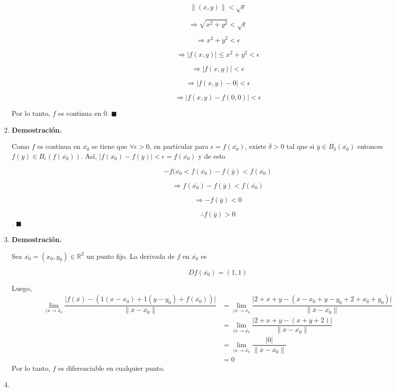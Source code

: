 \documentclass[fleqn]{article}
\begin{document}
\begin{enumerate}
        $$ \lVert (x,y) \rVert < \sqrt{\epsilon} $$

        $$ \Longrightarrow \sqrt{x^2 + y^2} < \sqrt{\epsilon} $$

        $$ \Longrightarrow x^2 + y^2 < \epsilon $$

        $$ \Longrightarrow \lvert f(x,y) \rvert \leq x^2 + y^2 < \epsilon $$

        $$ \Longrightarrow \lvert f(x,y) \rvert < \epsilon $$

        $$ \Longrightarrow \lvert f(x,y) - 0 \rvert < \epsilon $$

        $$ \Longrightarrow \lvert f(x,y) - f(0,0) \rvert < \epsilon $$

        Por lo tanto, $ f $ es continua en $ \overline{0} $. $ \blacksquare $

        \item \textbf{Demostración.}

        Como $ f $ es continua en $ \overline{x_0} $ se tiene que $ \forall \epsilon > 0 $, en particular para $ \epsilon = f(\overline{x_0}) $, existe $ \delta > 0 $ tal que si $ \overline{y} \in B_\delta (\overline{x_0}) $ entonces $ f(\overline{y}) \in B_\epsilon (f(\overline{x_0})) $. Así, $ \lvert f(\overline{x_0}) - f(\overline{y}) \rvert < \epsilon = f(\overline{x_0}) $ y de esto

        $$ -f(\overline{x_0} < f(\overline{x_0}) - f(\overline{y}) < f(\overline{x_0}) $$

        $$ \Longrightarrow f(\overline{x_0}) - f(\overline{y}) < f(\overline{x_0}) $$

        $$ \Longrightarrow - f(\overline{y}) < 0 $$

        $$ \therefore f(\overline{y}) > 0 $$. $ \blacksquare $

        \item \textbf{Demostración.}

        Sea $ \overline{x_0} = (x_0,y_0) \in \mathbb{R}^2 $ un punto fijo. La derivada de $ f $ en $ \overline{x_0} $ es

        $$ D f(\overline{x_0}) = (1,1) $$ 
        
        Luego,
        \begin{align*}
            \lim_{(\overline{x} \to \overline{x_0}} \dfrac{\lvert f(\overline{x}) - (1(x - x_0) + 1(y - y_0) + f(\overline{x_0})) \rvert}{\lVert \overline{x} - \overline{x_0} \rVert} &= \lim_{(\overline{x} \to \overline{x_0}} \dfrac{\lvert 2 + x + y - (x - x_0 + y - y_0 + 2 + x_0 + y_0) \rvert}{\lVert \overline{x} - \overline{x_0} \rVert} \\
            &= \lim_{(\overline{x} \to \overline{x_0}} \dfrac{\lvert 2 + x + y - (x + y + 2) \rvert}{\lVert \overline{x} - \overline{x_0} \rVert} \\
            &= \lim_{(\overline{x} \to \overline{x_0}} \dfrac{\lvert 0 \rvert}{\lVert \overline{x} - \overline{x_0} \rVert} \\
            &= 0
        \end{align*}
        Por lo tanto, $ f $ es diferenciable en cualquier punto.

        \item 

    \end{enumerate}
\end{document}
